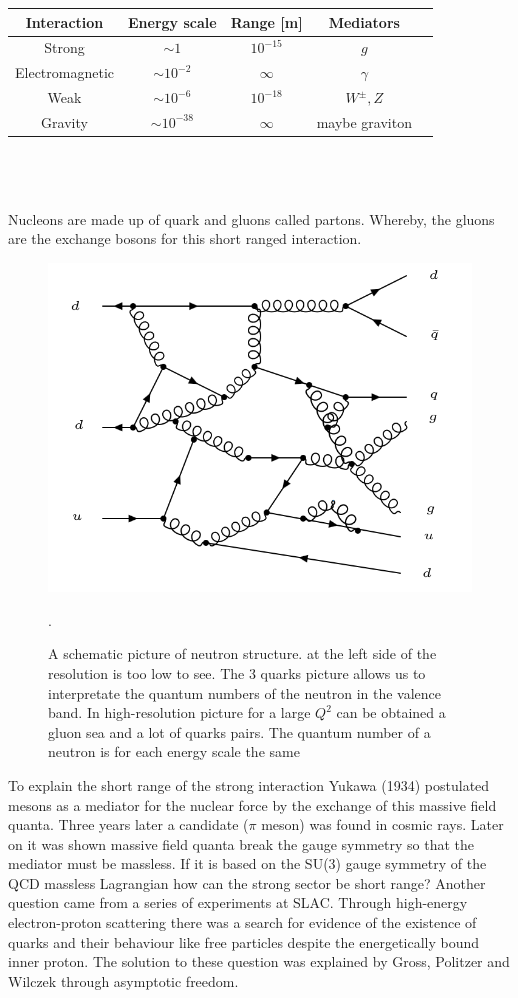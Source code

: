 \begin{tabular}{|c|c|c|c|c|}
\hline 
Interaction & Energy scale & Range [m] & Mediators \\ 
\hline 
Strong & $ \sim 1 $  & $10^{-15} $ & $g$ \\ 
\hline 
Electromagnetic & $ \sim 10^{-2} $ & $\infty$ & $\gamma $ \\ 
\hline  
Weak & $ \sim 10^{-6} $ & $10^{-18}$ & $W^{\pm}, Z$ \\ 
\hline
Gravity & $ \sim 10^{-38} $ & $\infty$ & maybe graviton \\ 
\hline 
\end{tabular}  
\\
\\
\\
Nucleons are made up of quark and gluons called partons.
Whereby, the gluons are the exchange bosons for this short ranged interaction.
\begin{figure}[h!]
\centering
\includegraphics[scale=0.8]{images/Intro/Neutron.png}
\caption{A schematic picture of neutron structure. at the left side of the resolution is too low to see. The 3 quarks picture allows us to interpretate the quantum numbers of the neutron in the valence band.
In high-resolution picture for a large $ Q^2 $ can be obtained a gluon sea and a lot of quarks pairs\cite{Cunha13}. The quantum number of a neutron is for each energy scale the same}.
\end{figure}
To explain the short range of the strong interaction Yukawa (1934) postulated mesons as a mediator for the nuclear force by the exchange of this massive field quanta. Three years later a candidate ($ \pi $ meson) was found in cosmic rays. Later on it was shown massive field quanta break the gauge symmetry so that the mediator must be massless. If it is based on the SU(3) gauge symmetry of the QCD massless Lagrangian how can the strong sector be short range? Another question came from a series of experiments at SLAC. Through high-energy electron-proton scattering there was a search for evidence of the existence of quarks and their behaviour like free particles despite the energetically bound inner proton. The solution to these question was explained by Gross, Politzer and Wilczek through asymptotic freedom. 
